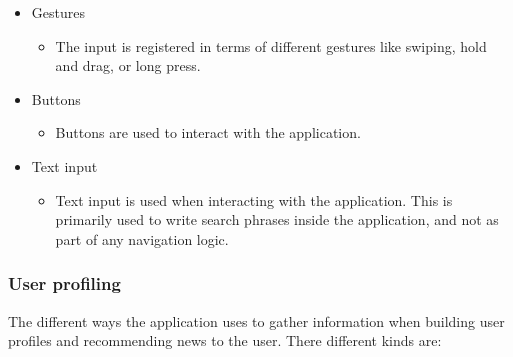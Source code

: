 \begin{itemize}
	\item Gestures
	\begin{itemize}
		\item The input is registered in terms of different gestures like swiping, hold and drag, or long press.
	\end{itemize}

	\item Buttons
	\begin{itemize}
		\item Buttons are used to interact with the application.
	\end{itemize}

	\item Text input
	\begin{itemize}
		\item Text input is used when interacting with the application. This is primarily used to write search phrases inside the application, and not as part of any navigation logic.
	\end{itemize}
\end{itemize}

\subsubsection{User profiling}
The different ways the application uses to gather information when building user profiles and recommending news to the user. There different kinds are:

